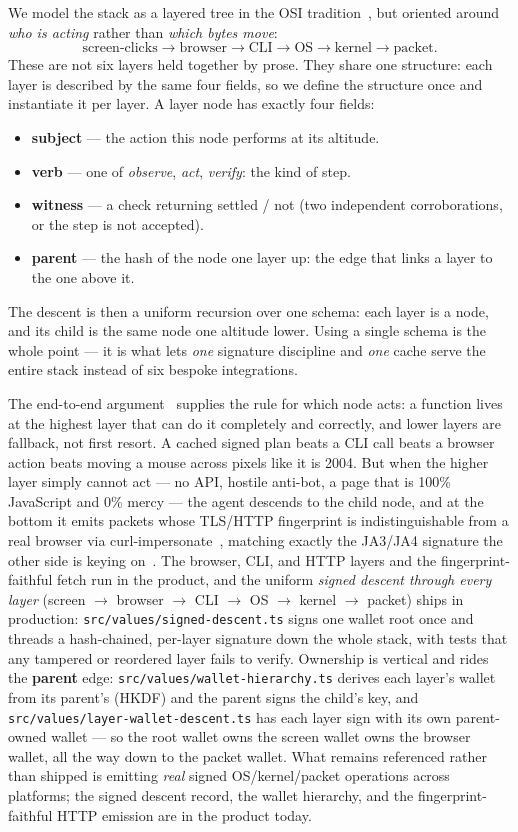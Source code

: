 \documentclass[11pt]{article}
\begin{document}
We model the stack as a layered tree in the OSI tradition~\cite{osi}, but oriented
around \emph{who is acting} rather than \emph{which bytes move}:
\[
\text{screen-clicks} \to \text{browser} \to \text{CLI} \to \text{OS} \to
\text{kernel} \to \text{packet}.
\]
These are not six layers held together by prose. They share one structure: each
layer is described by the same four fields, so we define the structure once and
instantiate it per layer. A layer node has exactly four fields:
\begin{itemize}[leftmargin=1.4em,itemsep=1pt]
  \item \textbf{subject} --- the action this node performs at its altitude.
  \item \textbf{verb} --- one of \emph{observe}, \emph{act}, \emph{verify}: the kind of step.
  \item \textbf{witness} --- a check returning settled / not (two independent
        corroborations, or the step is not accepted).
  \item \textbf{parent} --- the hash of the node one layer up: the edge that links
        a layer to the one above it.
\end{itemize}
The descent is then a uniform recursion over one schema: each layer is a node, and
its child is the same node one altitude lower. Using a single schema is the whole
point --- it is what lets \emph{one} signature discipline and \emph{one} cache
serve the entire stack instead of six bespoke integrations.

The end-to-end argument~\cite{e2e} supplies the rule for which node acts: a function
lives at the highest layer that can do it completely and correctly, and lower layers
are fallback, not first resort. A cached signed plan beats a CLI call beats a browser
action beats moving a mouse across pixels like it is 2004. But when the higher layer
simply cannot act --- no API, hostile anti-bot, a page that is 100\% JavaScript and
0\% mercy --- the agent descends to the child node, and at the bottom it emits packets
whose TLS/HTTP fingerprint is indistinguishable from a real browser via
curl-impersonate~\cite{curlimpersonate}, matching exactly the JA3/JA4 signature the
other side is keying on~\cite{ja3,ja4}. The browser, CLI, and HTTP layers and the
fingerprint-faithful fetch run in the product, and the uniform \emph{signed descent through every
layer} (screen $\to$ browser $\to$ CLI $\to$ OS $\to$ kernel $\to$ packet) ships in
production: \texttt{src/values/signed-descent.ts} signs one wallet root once and
threads a hash-chained, per-layer signature down the whole stack, with tests that any
tampered or reordered layer fails to verify. Ownership is vertical and rides the
\textbf{parent} edge: \texttt{src/values/wallet-hierarchy.ts} derives each layer's
wallet from its parent's (HKDF) and the parent signs the child's key, and
\texttt{src/values/layer-wallet-descent.ts} has each layer sign with its own
parent-owned wallet --- so the root wallet owns the screen wallet owns the browser
wallet, all the way down to the packet wallet. What remains referenced rather than
shipped is emitting \emph{real} signed OS/kernel/packet operations across platforms;
the signed descent record, the wallet hierarchy, and the fingerprint-faithful HTTP
emission are in the product today.
\end{document}
